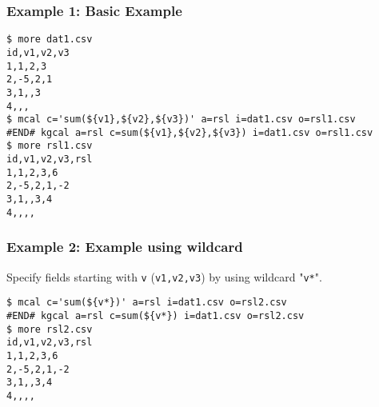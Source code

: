 \subsubsection*{Example 1: Basic Example}



\begin{Verbatim}[baselinestretch=0.7,frame=single]
$ more dat1.csv
id,v1,v2,v3
1,1,2,3
2,-5,2,1
3,1,,3
4,,,
$ mcal c='sum(${v1},${v2},${v3})' a=rsl i=dat1.csv o=rsl1.csv
#END# kgcal a=rsl c=sum(${v1},${v2},${v3}) i=dat1.csv o=rsl1.csv
$ more rsl1.csv
id,v1,v2,v3,rsl
1,1,2,3,6
2,-5,2,1,-2
3,1,,3,4
4,,,,
\end{Verbatim}
\subsubsection*{Example 2: Example using wildcard}

Specify fields starting with \verb|v| (\verb|v1,v2,v3|) by using wildcard "\verb|v*|".


\begin{Verbatim}[baselinestretch=0.7,frame=single]
$ mcal c='sum(${v*})' a=rsl i=dat1.csv o=rsl2.csv
#END# kgcal a=rsl c=sum(${v*}) i=dat1.csv o=rsl2.csv
$ more rsl2.csv
id,v1,v2,v3,rsl
1,1,2,3,6
2,-5,2,1,-2
3,1,,3,4
4,,,,
\end{Verbatim}
